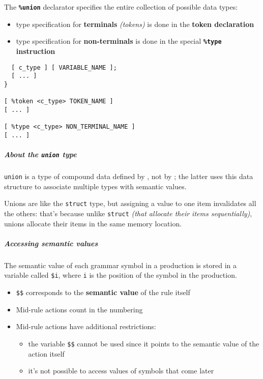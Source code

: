 \documentclass[english]{article}
\begin{document}
The \textbf{\texttt{\%union}} declarator specifies the entire collection of possible data types:

\begin{itemize}
  \item type specification for \textbf{terminals} \textit{(tokens)} is done in the \textbf{token declaration}
  \item type specification for \textbf{non-terminals} is done in the special \textbf{\texttt{\%type} instruction}
\end{itemize}

\begin{onepage}
  \begin{lstlisting}[language=LANCE, caption={Semantic value declaration}, label={lst:bison-semantic-value-declaration}]
%union {
  [ c_type ] [ VARIABLE_NAME ];
  [ ... ]
}

[ %token <c_type> TOKEN_NAME ]
[ ... ]

[ %type <c_type> NON_TERMINAL_NAME ]
[ ... ]
\end{lstlisting}
\end{onepage}

\subparagraph*{About the \texttt{union} type}
\texttt{union} is a type of compound data defined by \clang, not by \bison;
the latter uses this data structure to associate multiple types with semantic values.

Unions are like the \texttt{struct} type, but assigning a value to one item invalidates all the others:
that's because unlike \texttt{struct} \textit{(that allocate their items sequentially)}, unions allocate their items in the same memory location.

\subparagraph*{Accessing semantic values}
The semantic value of each grammar symbol in a production is stored in a variable called \texttt{\$i}, where \texttt{i} is the position of the symbol in the production.

\begin{itemize}
  \item \texttt{\$\$} corresponds to the \textbf{semantic value} of the rule itself
  \item Mid-rule actions count in the numbering
  \item Mid-rule actions have additional restrictions:
        \begin{itemize}
          \item the variable \texttt{\$\$} cannot be used since it points to the semantic value of the action itself
          \item it's not possible to access values of symbols that come later
        \end{itemize}
\end{itemize}
\end{document}
